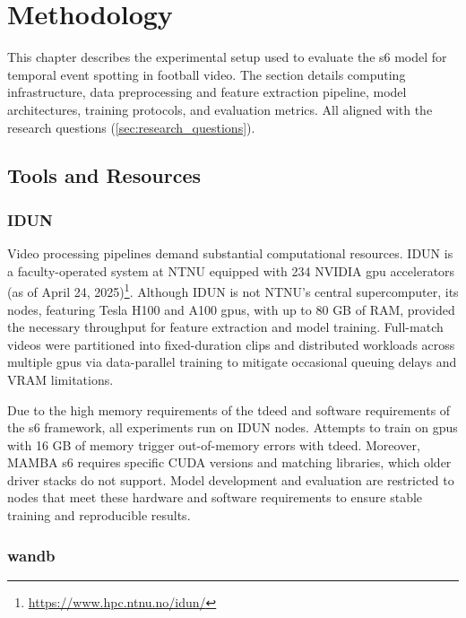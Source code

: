 \chapter{Methodology} 
\label{chap:methodology}
This chapter describes the experimental setup used to evaluate the \acrfull{s6} model for temporal event spotting in football video. The section details computing infrastructure, data preprocessing and feature extraction pipeline, model architectures, training protocols, and evaluation metrics. All aligned with the research questions (\autoref{sec:research_questions}).


\section{Tools and Resources}
\label{sec:tools_and_resources}

\subsection{IDUN}
\label{ssec:idun}
Video processing pipelines demand substantial computational resources. IDUN is a faculty-operated system at NTNU equipped with 234 NVIDIA \acrfull{gpu} accelerators (as of April 24, 2025)\footnote{\url{https://www.hpc.ntnu.no/idun/}}. Although IDUN is not NTNU's central supercomputer, its nodes, featuring Tesla H100 and A100 \acrshort{gpu}s, with up to 80 GB of RAM, provided the necessary throughput for feature extraction and model training. Full-match videos were partitioned into fixed-duration clips and distributed workloads across multiple \acrshort{gpu}s via data-parallel training to mitigate occasional queuing delays and VRAM limitations.

Due to the high memory requirements of the \acrfull{tdeed} and software requirements of the \acrfull{s6} framework, all experiments run on IDUN nodes. Attempts to train on \acrshort{gpu}s with 16 GB of memory trigger out-of-memory errors with \acrshort{tdeed}. Moreover, MAMBA \acrshort{s6} requires specific CUDA versions and matching libraries, which older driver stacks do not support. Model development and evaluation are restricted to nodes that meet these hardware and software requirements to ensure stable training and reproducible results. 



\subsection{\acrfull{wandb}}
\label{ssec:wandb}


